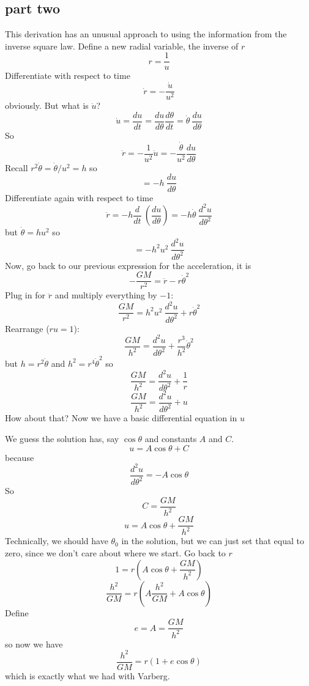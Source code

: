 \documentclass[11pt, oneside]{article}
\begin{document}
\subsection*{part two}
This derivation has an unusual approach to using the information from the inverse square law.  Define a new radial variable, the inverse of $r$
\[ r= \frac{1}{u} \]
Differentiate with respect to time
\[ \dot{r} = - \frac{\dot{u}}{u^2} \]
obviously.  But what is $\dot{u}$?
\[ \dot{u}= \frac{du}{dt} =  \frac{du}{d\theta} \frac{d\theta}{dt} =  \dot{\theta} \ \frac{du}{d\theta} \]
So
\[ \dot{r}= -\frac{1}{u^2} \dot{u} =  -\frac{\dot{\theta}}{u^2} \frac{du}{d\theta} \]
Recall $r^2 \dot{\theta} = \dot{\theta}/u^2 = h$ so
\[ = -h \ \frac{du}{d \theta}\]
Differentiate again with respect to time
\[ \ddot{r} = -h \frac{d}{dt} \ (\frac{du}{d \theta}) = -h \dot{\theta} \ \frac{d^2 u}{d\theta^2} \]
but $\dot{\theta} = hu^2$ so
\[ = - h^2 u^2 \  \frac{d^2 u}{d\theta^2} \]
Now, go back to our previous expression for the acceleration, it is
\[  - \frac{GM}{r^2}  =  \ddot{r} - r \dot{\theta}^2 \]
Plug in for $\ddot{r}$ and multiply everything by $-1$:
\[ \frac{GM}{r^2}  = h^2 u^2 \  \frac{d^2 u}{d\theta^2} + r \dot{\theta}^2 \]
Rearrange ($ru=1$):
\[ \frac{GM}{h^2}  =  \frac{d^2 u}{d\theta^2} + \frac{r^3}{h^2} \dot{\theta}^2 \]
but $h = r^2 \dot{\theta}$ and $h^2 = r^4 \dot{\theta}^2$ so
\[ \frac{GM}{h^2}  =  \frac{d^2 u}{d\theta^2} + \frac{1}{r}  \]
\[ \frac{GM}{h^2}  =  \frac{d^2 u}{d\theta^2} + u \]
How about that?  Now we have a basic differential equation in $u$

We guess the solution has, say $\cos \theta$ and constants $A$ and $C$.
\[ u = A \cos \theta + C \]
because
\[ \frac{d^2 u}{d\theta^2} = -A \cos \theta  \]
So
\[ C = \frac{GM}{h^2} \]
\[ u = A \cos \theta + \frac{GM}{h^2} \]
Technically, we should have $\theta_0$ in the solution, but we can just set that equal to zero, since we don't care about where we start.  Go back to $r$
\[ 1 = r(A \cos \theta + \frac{GM}{h^2}) \]
\[  \frac{h^2}{GM} = r(A \frac{h^2}{GM} + A \cos \theta) \]
Define 
\[ e = A = \frac{GM}{h^2} \]
so now we have
\[ \frac{h^2}{GM} = r(1 + e \cos \theta) \]
which is exactly what we had with Varberg.
\end{document}
